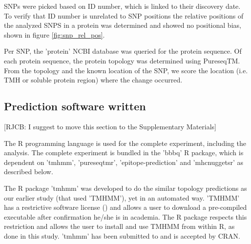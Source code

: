 %
SNPs were picked based on ID number, which is linked to their discovery date. To verify that ID number is unrelated to SNP positions the relative positions of the analyzed SNPS in a protein was determined and showed no positional bias, shown in figure \ref{fig:snp_rel_pos}.

Per SNP, the 'protein' NCBI database was queried for the
protein sequence.
Of each protein sequence, the protein topology was determined 
using PureseqTM.
From the topology and the known location of the SNP, 
we score the location (i.e. TMH or soluble protein region) 
where the change occurred.

\subsection{Prediction software written}

[RJCB: I suggest to move this section to the Supplementary Materials]

The R programming language is used for the complete 
experiment, including the analysis.
The complete experiment is bundled in the 'bbbq' R package,
which is dependent on 'tmhmm', 'pureseqtmr', 
'epitope-prediction' and 'mhcnuggetsr'
as described below.


The R package 'tmhmm' was developed to do the similar topology
predictions as our earlier study (that used 'TMHMM'), yet in an automated way.
'TMHMM' has a restrictive software license (\cite{krogh2001predicting}) and allows a user
to download a pre-compiled executable after confirmation he/she
is in academia. The R package respects this restriction
and allows the user to install and use TMHMM from within R,
as done in this study.
'tmhmm' has been submitted to and is accepted by CRAN.


